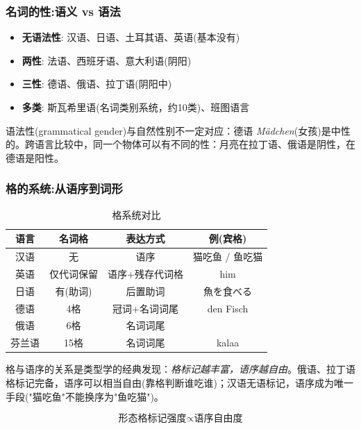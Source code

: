\subsubsection{名词的性:语义 vs 语法}

\begin{itemize}
    \item \textbf{无语法性}: 汉语、日语、土耳其语、英语(基本没有)
    \item \textbf{两性}: 法语、西班牙语、意大利语(阴阳)
    \item \textbf{三性}: 德语、俄语、拉丁语(阴阳中)
    \item \textbf{多类}: 斯瓦希里语(名词类别系统，约10类)、班图语言
\end{itemize}

语法性(grammatical gender)与自然性别不一定对应：德语 \emph{Mädchen}(女孩)是中性的。跨语言比较中，同一个物体可以有不同的性：月亮在拉丁语、俄语是阴性，在德语是阳性。

\subsubsection{格的系统:从语序到词形}

\begin{table}[H]
\centering
\caption{格系统对比}
\begin{tabulary}{\textwidth}{@{}CCCC@{}}
\toprule
\textbf{语言} & \textbf{名词格} & \textbf{表达方式} & \textbf{例(宾格)} \\
\midrule
汉语 & 无 & 语序 & 猫吃鱼 / 鱼吃猫 \\
英语 & 仅代词保留 & 语序+残存代词格 & him \\
日语 & 有(助词) & 后置助词 & 魚を食べる \\
德语 & 4格 & 冠词+名词词尾 & den Fisch \\
俄语 & 6格 & 名词词尾 &  \\
芬兰语 & 15格 & 名词词尾 & kalaa \\
\bottomrule
\end{tabulary}
\end{table}

格与语序的关系是类型学的经典发现：\emph{格标记越丰富，语序越自由}。俄语、拉丁语格标记完备，语序可以相当自由(靠格判断谁吃谁)；汉语无语标记，语序成为唯一手段("猫吃鱼"不能换序为"鱼吃猫")。

\begin{equation}
    \text{形态格标记强度} \propto \text{语序自由度}
\end{equation}


